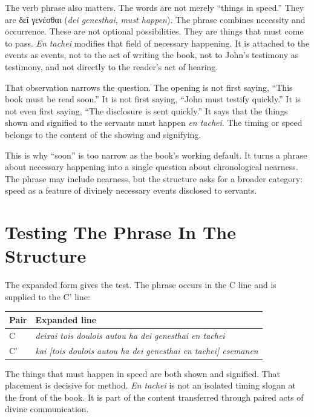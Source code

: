 The verb phrase also matters. The words are not merely ``things in speed.'' They are \textgreek{δεῖ γενέσθαι} (\textit{dei genesthai}, \textit{must happen}). The phrase combines necessity and occurrence. These are not optional possibilities. They are things that must come to pass. \textit{En tachei} modifies that field of necessary happening. It is attached to the events as events, not to the act of writing the book, not to John's testimony as testimony, and not directly to the reader's act of hearing.

That observation narrows the question. The opening is not first saying, ``This book must be read soon.'' It is not first saying, ``John must testify quickly.'' It is not even first saying, ``The disclosure is sent quickly.'' It says that the things shown and signified to the servants must happen \textit{en tachei}. The timing or speed belongs to the content of the showing and signifying.

This is why ``soon'' is too narrow as the book's working default. It turns a phrase about necessary happening into a single question about chronological nearness. The phrase may include nearness, but the structure asks for a broader category: speed as a feature of divinely necessary events disclosed to servants.

\section{Testing The Phrase In The Structure}

The expanded form gives the test. The phrase occurs in the C line and is supplied to the C' line:

\begin{center}
\begin{longtable}{@{}p{}p{}@{}}
\toprule
Pair & Expanded line \\
\midrule
C & \textit{deixai tois doulois autou ha dei genesthai en tachei} \\
C' & \textit{kai [tois doulois autou ha dei genesthai en tachei] esemanen} \\
\bottomrule
\end{longtable}
\end{center}

The things that must happen in speed are both shown and signified. That placement is decisive for method. \textit{En tachei} is not an isolated timing slogan at the front of the book. It is part of the content transferred through paired acts of divine communication.

